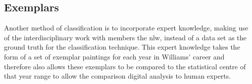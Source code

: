 \subsection{Exemplars}
Another method of classification is to incorporate expert knowledge, making use of the 
interdisciplinary work with members the \gls{nlw}, instead of a data set as the ground truth for
the classification technique. This expert knowledge takes the form of a set of exemplar paintings
for each year in Williams' career and therefore also allows these exemplars to be compared to the
statistical centre of that year range to allow the comparison digital analysis to human experts.
